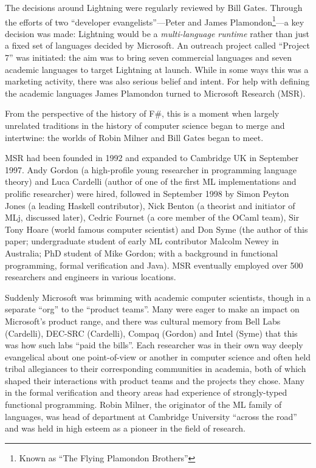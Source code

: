 \documentclass[acmsmall,screen]{acmart}
\begin{document}
The decisions around Lightning were regularly reviewed by Bill Gates. Through the efforts of two “developer evangelists”---Peter
and James Plamondon\footnote{Known as “The Flying Plamondon Brothers”}---a key decision was made: Lightning would
be a \emph{multi-language runtime} rather than just a fixed set of languages decided by Microsoft.  An outreach
project called “Project 7” was initiated: the aim was to bring seven commercial languages and seven academic languages to
target Lightning at launch. While in some ways this was a marketing activity, there was also serious belief and intent.  For
help with defining the academic languages James Plamondon turned to Microsoft Research (MSR).

From the perspective of the history of F\#, this is a moment when largely unrelated traditions in the history of computer science began to merge and intertwine: the worlds of Robin Milner and Bill Gates began to meet.

MSR had been founded in 1992 and expanded to Cambridge UK in September 1997. Andy Gordon (a high-profile young researcher in
programming language theory) and Luca Cardelli (author of one of the first ML implementations and prolific researcher) were hired, followed
in September 1998 by Simon Peyton Jones (a leading Haskell contributor), Nick Benton (a theorist and initiator of MLj, discussed later), Cedric
Fournet (a core member of the OCaml team), Sir Tony Hoare (world famous computer scientist) and Don Syme (the author of this paper; undergraduate
student of early ML contributor Malcolm Newey in Australia; PhD student of Mike Gordon; with a background in functional programming, formal
verification and Java). MSR eventually employed over 500 researchers and engineers in various locations.  

Suddenly Microsoft was brimming with academic computer scientists, though in a separate “org” to the “product teams”.  Many were eager
to make an impact on Microsoft’s product range, and there was cultural memory from Bell Labs (Cardelli), DEC-SRC (Cardelli), Compaq (Gordon) and
Intel (Syme) that this was how such labs “paid the bills”.  Each researcher was in their own way deeply evangelical about one point-of-view or
another in computer science and often held tribal allegiances to their corresponding communities in academia, both of which shaped their
interactions with product teams and the projects they chose. Many in the formal verification and theory areas had experience of strongly-typed
functional programming. Robin Milner, the originator of the ML family of languages, was head of department at Cambridge University “across the road” and
was held in high esteem as a pioneer in the field of research. 
\end{document}
